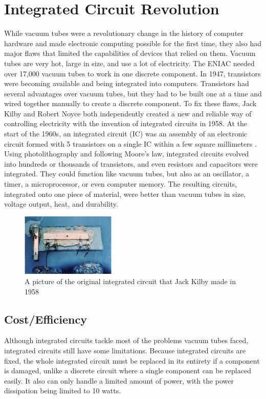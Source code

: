 \documentclass[letterpaper, 10 pt, conference]{IEEEconf}
\begin{document}

\section{Integrated Circuit Revolution}

While vacuum tubes were a revolutionary change in the history of computer hardware and made electronic computing possible for the first time, they also had major flaws that limited the capabilities of devices that relied on them. Vacuum tubes are very hot, large in size, and use a lot of electricity. The ENIAC needed over 17,000 vacuum tubes to work in one discrete component. In 1947, transistors were becoming available and being integrated into computers. Transistors had several advantages over vacuum tubes, but they had to be built one at a time and wired together manually to create a discrete component. To fix these flaws, Jack Kilby and Robert Noyce both independently created a new and reliable way of controlling electricity with the invention of integrated circuits in 1958. At the start of the 1960s, an integrated circuit (IC) was an assembly of an electronic circuit formed with 5 transistors on a single IC within a few square millimeters . Using photolithography and following Moore’s law, integrated circuits evolved into hundreds or thousands of transistors, and even resistors and capacitors were integrated. They could function like vacuum tubes, but also as an oscillator, a timer, a microprocessor, or even computer memory. The resulting circuits, integrated onto one piece of material, were better than vacuum tubes in size, voltage output, heat, and durability.


\begin{figure}[h!]
\centering
\captionsetup{justification=centering}
\includegraphics[width=0.4\textwidth]{Kilby_solid_circuit.jpg}
\caption{A picture of the original integrated circuit that Jack Kilby made in 1958}
\label{fig:example}
\end{figure}


\subsection{Cost/Efficiency}
Although integrated circuits tackle most of the problems vacuum tubes faced, integrated circuits still have some limitations. Because integrated circuits are fixed, the whole integrated circuit must be replaced in its entirety if a component is damaged, unlike a discrete circuit where a single component can be replaced easily. It also can only handle a limited amount of power, with the power dissipation being limited to 10 watts. 
\end{document}
